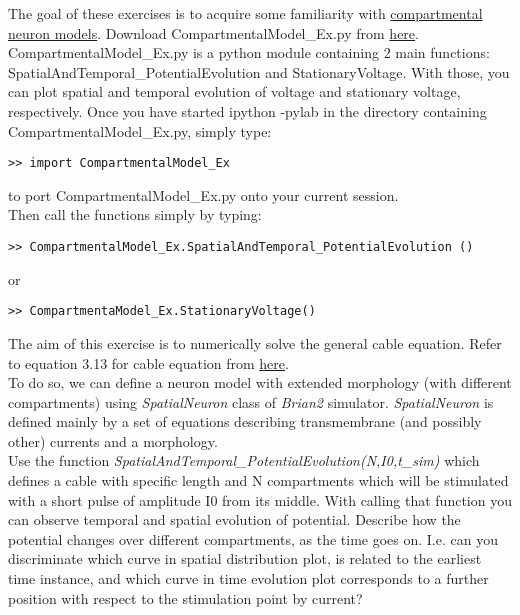 \documentclass[a4paper,10pt]{Exercises}
\begin{document}
\newcommand{\erf}{\textrm{erf}}


The goal of these exercises is to acquire some familiarity with \href{http://neuronaldynamics.epfl.ch/online/Ch3.S4.html}{compartmental neuron models}.
Download CompartmentalModel\_Ex.py  from  \href{http://neuronaldynamics.epfl.ch/lectures.html}{here}.  CompartmentalModel\_Ex.py is a python module containing 2 main functions:  SpatialAndTemporal\_PotentialEvolution and StationaryVoltage. With those, you can plot spatial and temporal evolution of voltage  and stationary voltage, respectively. Once you have started ipython -pylab in the directory containing CompartmentalModel\_Ex.py, simply type:
\begin{verbatim}
>> import CompartmentalModel_Ex
\end{verbatim}
to port CompartmentalModel\_Ex.py onto your current session.  \\ Then call the functions simply by typing:
\begin{verbatim}
>> CompartmentalModel_Ex.SpatialAndTemporal_PotentialEvolution ()
\end{verbatim}
or
\begin{verbatim}
>> CompartmentaModel_Ex.StationaryVoltage()
\end{verbatim}
\Exercise[]
The aim of this exercise is to numerically solve the general cable equation. Refer to equation 3.13 for cable equation from \href{http://neuronaldynamics.epfl.ch/online/Ch3.S2.html} {here}.\\
To do so, we can define a neuron model with extended morphology (with different compartments) using \textit{SpatialNeuron} class of \textit{Brian2} simulator. \textit{SpatialNeuron} is defined mainly by a set of equations describing transmembrane (and possibly other) currents and a morphology. \\
Use the function \textit{SpatialAndTemporal\_PotentialEvolution(N,I0,t\_sim)} which defines a cable  with specific length and N compartments which will be stimulated with a short pulse of amplitude I0 from its middle. With calling that function you can observe temporal and spatial evolution of potential.
\Question Describe how the potential changes over different compartments, as the time goes on. I.e. can you discriminate which curve in spatial distribution plot, is related to the earliest time instance, and which curve in time evolution plot corresponds to a further position with respect to the stimulation point by current?
\end{document}
